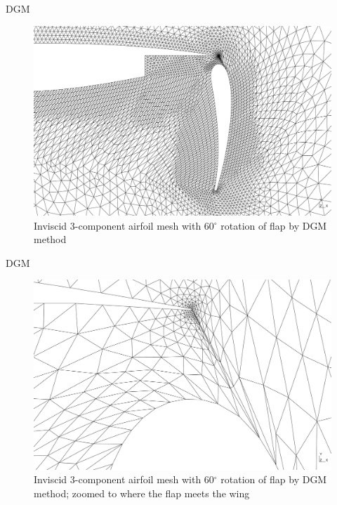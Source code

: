 \documentclass[t,12pt]{beamer}
\begin{document}
\begin{frame}{DGM}
	\begin{figure}[!h]
		\centering
		\includegraphics[scale=0.17]{wing60-dg-ms}
		\caption{Inviscid 3-component airfoil mesh with 60$^\circ$ rotation of flap by DGM method}
		\label{fig:wing-inviscid-dg-ms}
	\end{figure}
\end{frame}
\begin{frame}{DGM}
	\begin{figure}[!h]
		\centering
		\includegraphics[scale=0.17]{wing60-dg-ms_zoomed}
		\caption{Inviscid 3-component airfoil mesh with 60$^\circ$ rotation of flap by DGM method; zoomed to where the flap meets the wing}
		\label{fig:wing-inviscid-dg-ms-zoomed}
	\end{figure}
\end{frame}
\end{document}
